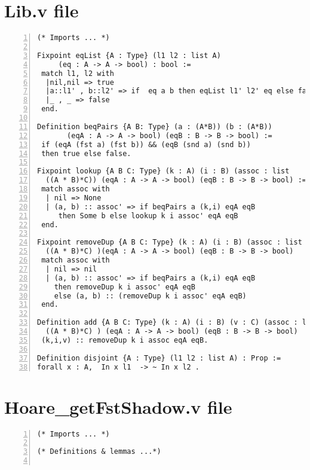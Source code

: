 \begin{appendices}
\section{Lib.v file} \label{LibFile}
\begin{lstlisting}[xleftmargin=-.1\textwidth,
xrightmargin=-.1\textwidth,
mathescape=true,numbers=left]
(* Imports ... *)

Fixpoint eqList {A : Type} (l1 l2 : list A) 
	 (eq : A -> A -> bool) : bool := 
 match l1, l2 with 
  |nil,nil => true
  |a::l1' , b::l2' => if  eq a b then eqList l1' l2' eq else false
  |_ , _ => false
 end.

Definition beqPairs {A B: Type} (a : (A*B)) (b : (A*B)) 
	   (eqA : A -> A -> bool) (eqB : B -> B -> bool) :=
 if (eqA (fst a) (fst b)) && (eqB (snd a) (snd b))  
 then true else false.

Fixpoint lookup {A B C: Type} (k : A) (i : B) (assoc : list 
  ((A * B)*C)) (eqA : A -> A -> bool) (eqB : B -> B -> bool) :=
 match assoc with
  | nil => None  
  | (a, b) :: assoc' => if beqPairs a (k,i) eqA eqB 
  	 then Some b else lookup k i assoc' eqA eqB
 end. 
 
Fixpoint removeDup {A B C: Type} (k : A) (i : B) (assoc : list 
  ((A * B)*C) )(eqA : A -> A -> bool) (eqB : B -> B -> bool)   :=
 match assoc with
  | nil => nil
  | (a, b) :: assoc' => if beqPairs a (k,i) eqA eqB 
  	then removeDup k i assoc' eqA eqB 
  	else (a, b) :: (removeDup k i assoc' eqA eqB)
 end.

Definition add {A B C: Type} (k : A) (i : B) (v : C) (assoc : list 
  ((A * B)*C) ) (eqA : A -> A -> bool) (eqB : B -> B -> bool)  :=
 (k,i,v) :: removeDup k i assoc eqA eqB.

Definition disjoint {A : Type} (l1 l2 : list A) : Prop := 
forall x : A,  In x l1  -> ~ In x l2 . 
\end{lstlisting}
\pagebreak
\section{Hoare\_getFstShadow.v file} \label{getFstFile}
\begin{lstlisting}[xleftmargin=-.1\textwidth,
xrightmargin=-.1\textwidth,
mathescape=true,numbers=left]
(* Imports ... *)

(* Definitions & lemmas ...*)


\end{lstlisting}
\end{appendices}
